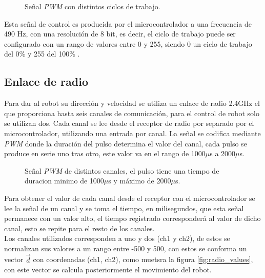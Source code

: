 \documentclass{iccmemoria}
\begin{document}
\begin{figure}[H]
  \centering
  \selectfont{
  
  }
  \caption[Ciclo de trabajo de señal \emph{PWM}]{Señal \emph{PWM} con distintos ciclos de trabajo.}
  \label{fig:pwm}
\end{figure}
 
Esta señal de control es producida por el microcontrolador a una frecuencia de 490 Hz, con una resolución de 8 bit, es decir, el ciclo de trabajo puede ser configurado con un rango de valores entre 0 y 255, siendo 0 un ciclo de trabajo del 0\% y 255 del 100\% \cite{referenceAnalogWrite}.\\

\subsection{Enlace de radio}

Para dar al robot su dirección y velocidad se utiliza un enlace de radio 2.4GHz el que proporciona hasta seis canales de comunicación, para el control de robot solo se utilizan dos. Cada canal se lee desde el receptor de radio por separado por el microcontrolador, utilizando una entrada por canal. La señal se codifica mediante \emph{PWM} donde la duración del pulso determina el valor del canal, cada pulso se produce en serie uno tras otro, este valor va en el rango de 1000$\mu$s a 2000$\mu$s.\\

\begin{figure}[H]
  \centering
  \selectfont{
  
  }
  \caption[Señal \emph{PWM} de los canales de radio.]{Señal \emph{PWM} de distintos canales, el pulso tiene una tiempo de duracion minimo de 1000$\mu$s y máximo de 2000$\mu$s.}
  \label{fig:pwm}
\end{figure}

Para obtener el valor de cada canal desde el receptor con el microcontrolador se lee la señal de un canal y se toma el tiempo, en milisegundos, que esta señal permanece con un valor alto, el tiempo registrado corresponderá al valor de dicho canal, esto se repite para el resto de los canales.\\
 
Los canales utilizados corresponden a uno y dos (ch1 y ch2), de estos se normalizan sus valores a un rango entre -500 y 500, con estos se conforma un vector $\vec{d}$ con coordenadas (ch1, ch2), como muetsra la figura \ref{fig:radio_values}, con este vector se calcula posteriormente el movimiento del robot.\\
\end{document}
